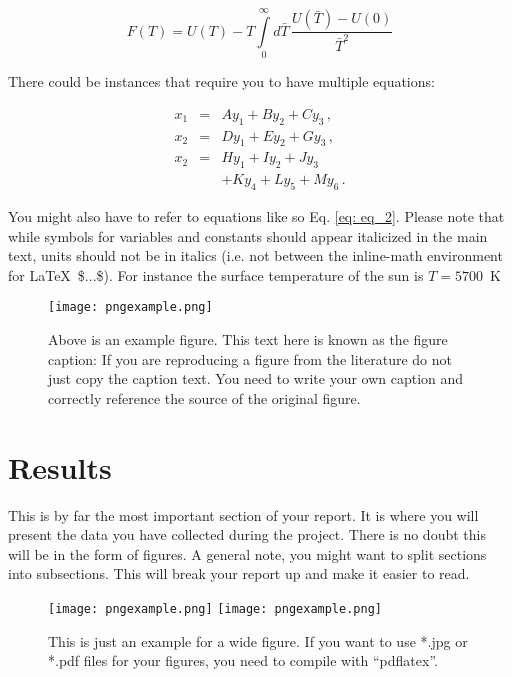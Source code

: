 \documentclass[a4paper,twocolumn,12pt, notitlepage]{article}
\begin{document}
\begin{equation}
F(T) = U(T) - T \int\limits_0^\infty d \bar{T} \, \frac{U(\bar{T}) - U(0)}{\bar{T}^2}
\label{equation1}
\end{equation}

There could be instances that require you to have multiple equations:

\begin{eqnarray}
x_1 &=& A y_1 + B y_2 + C y_3    \,, \\
x_2 &=& D y_1 + E y_2 + G y_3    \,, \\ 
x_2 &=& H y_1 + I y_2 + J y_3    \nonumber\\
    &~& + K y_4 + L y_5 + M y_6  \,. 
\label{eq: eq_2}
\end{eqnarray}

You might also have to refer to equations like so Eq. \eqref{eq: eq_2}. Please note that while symbols for variables and constants should appear italicized in the main text, units should not be in italics (i.e. not between the inline-math environment for \LaTeX\ \$...\$). For instance the surface temperature of the sun is $T = 5700$~K

\begin{figure}[t!]
\centering
\texttt{[image: pngexample.png]}
\vspace{-2mm}
\caption{Above is an example figure.  This text here is known as the figure caption: If you are reproducing a figure from the literature do not just copy the caption text. You need to write your own caption and correctly reference the source of the original figure.}
\label{fig: fig_1}
\end{figure}

\section{Results}
This is by far the most important section of your report. It is where you will present the data you have collected during the project. There is no doubt this will be in the form of figures. A general note, you might want to split sections into subsections. This will break your report up and make it easier to read.

\begin{figure*}[]
\centering
\texttt{[image: pngexample.png]} \hspace{3mm}
\texttt{[image: pngexample.png]}
\caption{\small This is just an example for a wide figure.
                If you want to use *.jpg or *.pdf files
                for your figures, you need to compile with
                ``pdflatex''.}
\label{fig: fig_2}
\end{figure*}
\end{document}
